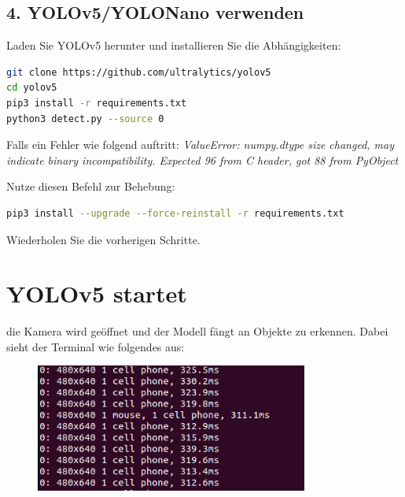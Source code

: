 \documentclass{article}
\begin{document}
\subsection*{4. YOLOv5/YOLONano verwenden}
Laden Sie YOLOv5 herunter und installieren Sie die Abhängigkeiten:
\begin{lstlisting}[language=bash]
git clone https://github.com/ultralytics/yolov5 
cd yolov5
pip3 install -r requirements.txt
python3 detect.py --source 0 
\end{lstlisting}

Falls ein Fehler wie folgend auftritt: 
\textit{ValueError: numpy.dtype size changed, may indicate binary incompatibility. 
Expected 96 from C header, got 88 from PyObject}

Nutze diesen Befehl zur Behebung:
\begin{lstlisting}[language=bash]
pip3 install --upgrade --force-reinstall -r requirements.txt
\end{lstlisting}
Wiederholen Sie die vorherigen Schritte.



\section{YOLOv5 startet}
die Kamera wird geöffnet und der Modell fängt an Objekte zu erkennen.
Dabei sieht der Terminal wie folgendes aus: 
\begin{figure}[h!]
    \centering
    \includegraphics[width=0.8\textwidth]{Bilder/terminalErgebnisse.png}
\end{figure}
\end{document}
